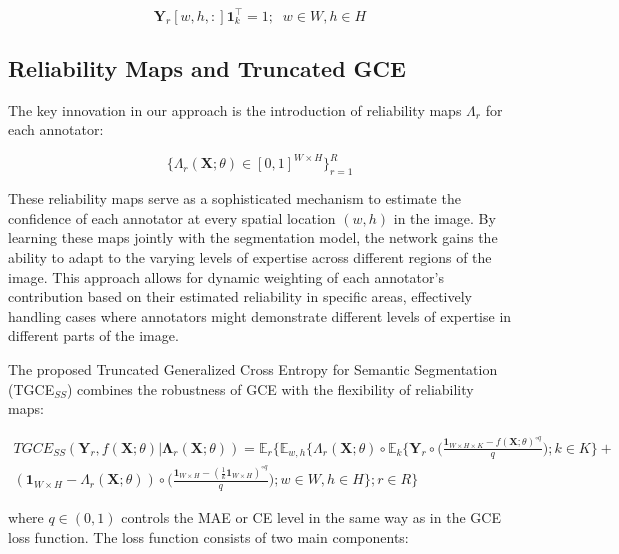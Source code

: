 \begin{equation}
  \mathbf Y_r[w,h,:] \mathbf{1} ^ \top _ k = 1; \;\; w \in W, h \in H
\end{equation}

\subsection{Reliability Maps and Truncated GCE}

The key innovation in our approach is the introduction of reliability
maps $\Lambda_r$ for each annotator:

\begin{equation}
  \bigg\{ \Lambda_r (\mathbf X; \theta ) \in [0,1] ^{W\times H} \bigg\}_{r=1}^R
\end{equation}

These reliability maps serve as a sophisticated mechanism to estimate
the confidence of each annotator at every spatial location $(w,h)$ in
the image. By learning these maps jointly with the segmentation
model, the network gains the ability to adapt to the varying levels
of expertise across different regions of the image. This approach
allows for dynamic weighting of each annotator's contribution based
on their estimated reliability in specific areas, effectively
handling cases where annotators might demonstrate different levels of
expertise in different parts of the image.

The proposed Truncated Generalized Cross Entropy for Semantic
Segmentation (TGCE$_{SS}$) combines the robustness of GCE with the
flexibility of reliability maps:

\begin{equation}
  \begin{split}
    TGCE_{SS}(\mathbf{Y}_r,f(\mathbf X;\theta) | \mathbf{\Lambda}_r
    (\mathbf X;\theta)) = \mathbb E_{r} \Bigg\{ \mathbb E_{w,h}
      \Bigg\{ \Lambda_r (\mathbf X; \theta) \circ \mathbb E_k \bigg\{
          \mathbf Y_r \circ \bigg( \frac{\mathbf 1 _{W\times H \times
        K} - f(\mathbf X;\theta) ^{\circ q }}{q} \bigg); k \in K  \bigg\}  + \\
        \left(\mathbf 1 _{W \times H } - \Lambda _r (\mathbf
        X;\theta)\right) \circ \bigg(   \frac{\mathbf 1_{W\times H} -
        (\frac {1}{k} \mathbf 1_{W\times H})^{\circ q}}{q} \bigg); w \in
    W, h \in H \Bigg\};r\in R\Bigg\}
  \end{split}
\end{equation}

where $q \in (0,1)$ controls the \gls{MAE} or \gls{CE} level in the
same way as in the \gls{GCE} loss function. The loss function consists of
two main components:

